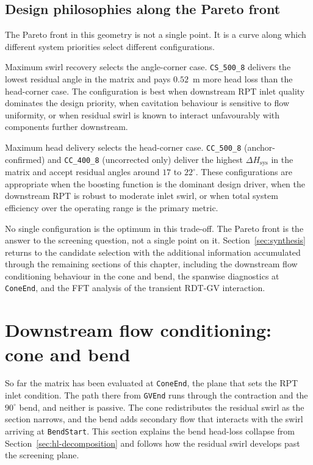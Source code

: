 \subsection{Design philosophies along the Pareto front}
\label{sec:pareto-design-philosophies}

The Pareto front in this geometry is not a single point. It is a curve along which different system priorities select different configurations.

Maximum swirl recovery selects the angle-corner case. \texttt{CS\_500\_8} delivers the lowest residual angle in the matrix and pays $0.52$~m more head loss than the head-corner case. The configuration is best when downstream RPT inlet quality dominates the design priority, when cavitation behaviour is sensitive to flow uniformity, or when residual swirl is known to interact unfavourably with components further downstream.

Maximum head delivery selects the head-corner case. \texttt{CC\_500\_8} (anchor-confirmed) and \texttt{CC\_400\_8} (uncorrected only) deliver the highest $\Delta H_{\mathrm{sys}}$ in the matrix and accept residual angles around $17$ to $22^\circ$. These configurations are appropriate when the boosting function is the dominant design driver, when the downstream RPT is robust to moderate inlet swirl, or when total system efficiency over the operating range is the primary metric.

No single configuration is the optimum in this trade-off. The Pareto front is the answer to the screening question, not a single point on it. Section~\ref{sec:synthesis} returns to the candidate selection with the additional information accumulated through the remaining sections of this chapter, including the downstream flow conditioning behaviour in the cone and bend, the spanwise diagnostics at \texttt{ConeEnd}, and the FFT analysis of the transient RDT-GV interaction.

\section{Downstream flow conditioning: cone and bend}
\label{sec:downstream-conditioning}

So far the matrix has been evaluated at \texttt{ConeEnd}, the plane that sets the RPT inlet condition. The path there from \texttt{GVEnd} runs through the contraction and the $90^\circ$ bend, and neither is passive. The cone redistributes the residual swirl as the section narrows, and the bend adds secondary flow that interacts with the swirl arriving at \texttt{BendStart}. This section explains the bend head-loss collapse from Section~\ref{sec:hl-decomposition} and follows how the residual swirl develops past the screening plane.

